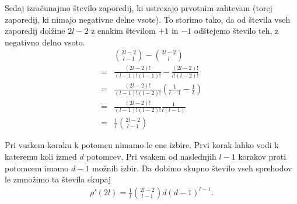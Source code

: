\begin{dokaz}
    Sedaj izračunajmo število zaporedij, ki ustrezajo prvotnim zahtevam (torej zaporedij, ki nimajo negativne delne vsote). To storimo tako, da od števila vseh zaporedij dolžine \(2l-2\) z enakim številom \(+1\) in \(-1\) odštejemo število teh, z negativno delno vsoto. 
    \begin{align*}
        &\binom{2l-2}{l-1} - \binom{2l-2}{l}\\
        =& \frac{(2l-2)!}{(l-1)!(l-1)!} - \frac{(2l-2)!}{l!(l-2)!}\\
        =& \frac{(2l-2)!}{(l-1)!(l-2)!}\left(\frac{1}{l-1} - \frac1l \right)\\
        =& \frac{(2l-2)!}{(l-1)!(l-2)!}\frac{1}{l(l-1)}\\
        =& \frac{1}{l}\binom{2l-2}{l-1}
    \end{align*}
    
    Pri vsakem koraku k potomcu nimamo le ene izbire. Prvi korak lahko vodi k kateremu koli izmed \(d\) potomcev. Pri vsakem od naslednjih \(l-1\) korakov proti potomcem imamo \(d-1\) možnih izbir. Da dobimo skupno število vseh sprehodov le zmnožimo ta števila skupaj
    \begin{align*}
        \rho'(2l) = \frac{1}{l}\binom{2l-2}{l-1} d (d-1)^{l-1}.
    \end{align*}
\end{dokaz}
